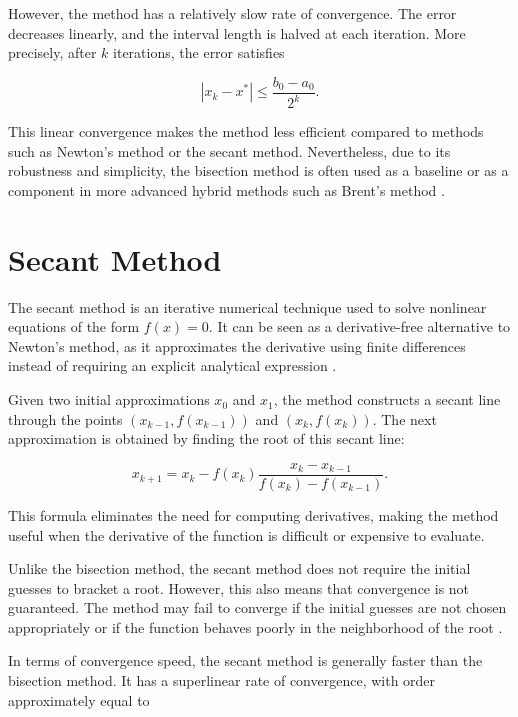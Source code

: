 However, the method has a relatively slow rate of convergence. The error decreases linearly, and the interval length is halved at each iteration. More precisely, after \( k \) iterations, the error satisfies

\begin{equation}
|x_k - x^*| \leq \frac{b_0 - a_0}{2^k}.
\end{equation}

This linear convergence makes the method less efficient compared to methods such as Newton's method or the secant method. Nevertheless, due to its robustness and simplicity, the bisection method is often used as a baseline or as a component in more advanced hybrid methods such as Brent's method \cite{atkinson, cs357}.

\section{Secant Method}

The secant method is an iterative numerical technique used to solve nonlinear equations of the form \( f(x) = 0 \). It can be seen as a derivative-free alternative to Newton's method, as it approximates the derivative using finite differences instead of requiring an explicit analytical expression \cite{burden, atkinson}.

Given two initial approximations \( x_0 \) and \( x_1 \), the method constructs a secant line through the points \( (x_{k-1}, f(x_{k-1})) \) and \( (x_k, f(x_k)) \). The next approximation is obtained by finding the root of this secant line:

\begin{equation}
x_{k+1} = x_k - f(x_k)\frac{x_k - x_{k-1}}{f(x_k) - f(x_{k-1})}.
\end{equation}

This formula eliminates the need for computing derivatives, making the method useful when the derivative of the function is difficult or expensive to evaluate.

Unlike the bisection method, the secant method does not require the initial guesses to bracket a root. However, this also means that convergence is not guaranteed. The method may fail to converge if the initial guesses are not chosen appropriately or if the function behaves poorly in the neighborhood of the root \cite{kelley}.

In terms of convergence speed, the secant method is generally faster than the bisection method. It has a superlinear rate of convergence, with order approximately equal to

